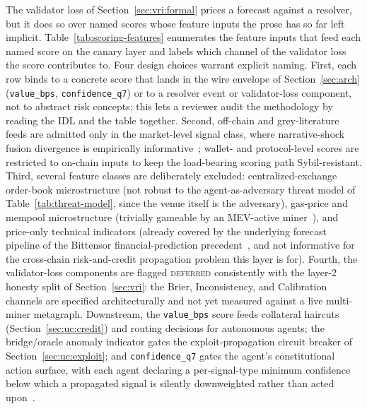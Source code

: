 \documentclass[journal]{IEEEtran}
\begin{document}
The validator loss of Section~\ref{sec:vri:formal} prices a forecast
against a resolver, but it does so over named scores whose feature
inputs the prose has so far left implicit.
Table~\ref{tab:scoring-features} enumerates the feature inputs that
feed each named score on the canary layer and labels which channel of
the validator loss the score contributes to. Four design choices
warrant explicit naming. First, each row binds to a concrete score
that lands in the wire envelope of Section~\ref{sec:arch}
(\texttt{value\_bps}, \texttt{confidence\_q7}) or to a resolver event
or validator-loss component, not to abstract risk concepts; this lets
a reviewer audit the methodology by reading the IDL and the table
together. Second, off-chain and grey-literature feeds are admitted
only in the market-level signal class, where narrative-shock fusion
divergence is empirically
informative~\cite{cong2022crypto}; wallet- and protocol-level scores
are restricted to on-chain inputs to keep the load-bearing scoring
path Sybil-resistant. Third, several feature classes are deliberately
excluded: centralized-exchange order-book microstructure (not
robust to the agent-as-adversary threat model of
Table~\ref{tab:threat-model}, since the venue itself is the
adversary), gas-price and mempool microstructure (trivially gameable
by an MEV-active miner~\cite{daian2020flash}), and price-only
technical indicators (already covered by the underlying
forecast pipeline of the Bittensor financial-prediction
precedent~\cite{taoshi2024ptn}, and not informative for the cross-chain
risk-and-credit propagation problem this layer is for).
Fourth, the validator-loss components are flagged \textsc{deferred}
consistently with the layer-2 honesty split of Section~\ref{sec:vri}:
the Brier, Inconsistency, and Calibration channels are specified
architecturally and not yet measured against a live multi-miner
metagraph. Downstream, the \texttt{value\_bps} score feeds collateral
haircuts (Section~\ref{sec:uc:credit}) and routing decisions for
autonomous agents; the bridge/oracle anomaly indicator gates the
exploit-propagation circuit breaker of Section~\ref{sec:uc:exploit};
and \texttt{confidence\_q7} gates the agent's constitutional action
surface, with each agent declaring a per-signal-type minimum
confidence below which a propagated signal is silently downweighted
rather than acted upon~\cite{bai2022constitutional}.
\end{document}
